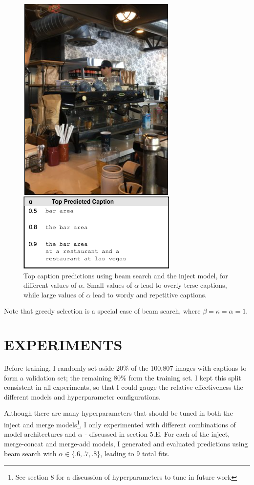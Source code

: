 \documentclass[letterpaper, 10 pt, conference]{ieeeconf}
\begin{document}
\begin{figure}[h]
\centering
\includegraphics[width=.6\linewidth]{alpha_affect}
\caption{Top caption predictions using beam search and the inject model, for different values of $\alpha$. Small values of $\alpha$ lead to overly terse captions, while large values of $\alpha$ lead to wordy and repetitive captions.}
\label{fig:test1}
\end{figure}

Note that greedy selection is a special case of beam search, where $\beta = \kappa = \alpha = 1$.  

\section{EXPERIMENTS}

Before training, I randomly set aside 20\% of the 100,807 images with captions to form a validation set; the remaining 80\% form the training set. I kept this split consistent in all experiments, so that I could gauge the relative effectiveness the different models and hyperparameter configurations. 

Although there are many hyperparameters that should be tuned in both the inject and merge models\footnote{See section 8 for a discussion of hyperparameters to tune in future work}, I only experimented with different combinations of model architectures and $\alpha$ - discussed in section 5.E. For each of the inject, merge-concat and merge-add models, I generated and evaluated predictions using beam search with $\alpha \in \{.6, .7, .8\}$, leading to 9 total fits. 
\end{document}
